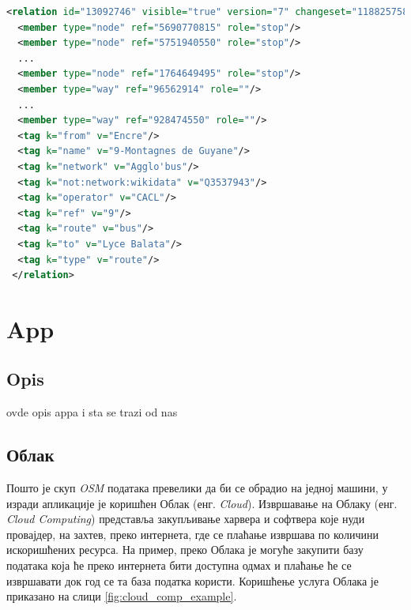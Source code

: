 \documentclass[12pt,oneside]{memoir}
\begin{document}
\begin{lstlisting}[language=XML, caption={\textit{XML} запис \textit{OSM} релације која представља аутобуску линију}, label={lst:osm_relation_xml}]
<relation id="13092746" visible="true" version="7" changeset="118825758" timestamp="2022-03-23T15:05:48Z" user="" uid="">
  <member type="node" ref="5690770815" role="stop"/>
  <member type="node" ref="5751940550" role="stop"/>
  ...
  <member type="node" ref="1764649495" role="stop"/>
  <member type="way" ref="96562914" role=""/>
  ...
  <member type="way" ref="928474550" role=""/>
  <tag k="from" v="Encre"/>
  <tag k="name" v="9-Montagnes de Guyane"/>
  <tag k="network" v="Agglo'bus"/>
  <tag k="not:network:wikidata" v="Q3537943"/>
  <tag k="operator" v="CACL"/>
  <tag k="ref" v="9"/>
  <tag k="route" v="bus"/>
  <tag k="to" v="Lyce Balata"/>
  <tag k="type" v="route"/>
 </relation>
\end{lstlisting}


\chapter{App}
\label{chp:app}

\section{Opis}
\label{sec:opis}

ovde opis appa i sta se trazi od nas

\section{Облак}
\label{sec:cloud}

Пошто је скуп \textit{OSM} података превелики да би се обрадио на једној машини, у изради апликације је коришћен Облак (енг. \textit{Cloud}). Извршавање на Облаку (енг. \textit{Cloud Computing}) \cite{cloud_computing} представља закупљивање харвера и софтвера које нуди провајдер, на захтев, преко интернета, где се плаћање извршава по количини искоришћених ресурса. На пример, преко Облака је могуће закупити базу података која ће преко интернета бити доступна одмах и плаћање ће се извршавати док год се та база податка користи. Коришћење услуга Облака је приказано на слици \ref{fig:cloud_comp_example}.
\end{document}
